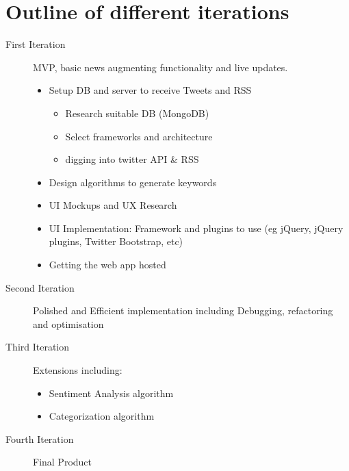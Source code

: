 \documentclass[a4paper,11pt]{article}
\begin{document}
	\section{Outline of different iterations}
	\begin{description}
	  \item[First Iteration] MVP, basic news augmenting functionality and live updates.
	    \begin{itemize}
	      
	      \item Setup DB and server to receive Tweets and RSS
	      
	      \begin{itemize}
	        \item Research suitable DB (MongoDB)
	        \item Select frameworks and architecture
	        \item digging into twitter API \& RSS
	      \end{itemize}
	      
	      \item Design algorithms to generate keywords
	      \item UI Mockups and UX Research
	      \item UI Implementation: Framework and plugins to use (eg jQuery, jQuery plugins, Twitter Bootstrap, etc)
	      \item Getting the web app hosted
	    \end{itemize}
	    \item[Second Iteration] Polished and Efficient implementation including Debugging, refactoring and optimisation
	    \item[Third Iteration] Extensions including:
	      \begin{itemize}
	        \item Sentiment Analysis algorithm
	        \item Categorization algorithm    
	      \end{itemize}
	      
	    \item[Fourth Iteration] Final Product
	  
	  
	\end{description}
	
\end{document}
